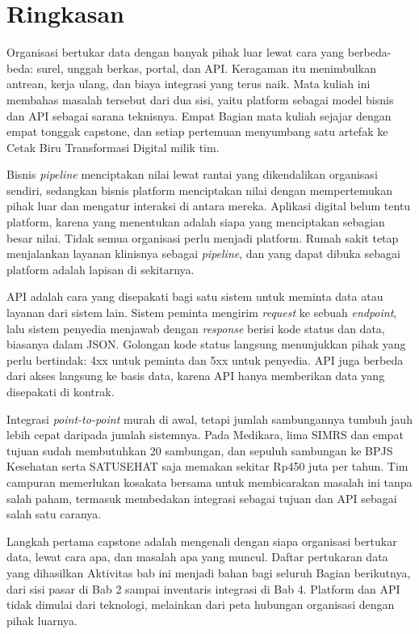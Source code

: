 \section{Ringkasan}

Organisasi bertukar data dengan banyak pihak luar lewat cara yang berbeda-beda:
surel, unggah berkas, portal, dan API. Keragaman itu menimbulkan antrean, kerja
ulang, dan biaya integrasi yang terus naik. Mata kuliah ini membahas masalah
tersebut dari dua sisi, yaitu platform sebagai model bisnis dan API sebagai
sarana teknisnya. Empat Bagian mata kuliah sejajar dengan empat tonggak capstone,
dan setiap pertemuan menyumbang satu artefak ke Cetak Biru Transformasi Digital
milik tim.

Bisnis \textit{pipeline} menciptakan nilai lewat rantai yang dikendalikan
organisasi sendiri, sedangkan bisnis platform menciptakan nilai dengan
mempertemukan pihak luar dan mengatur interaksi di antara mereka. Aplikasi digital
belum tentu platform, karena yang menentukan adalah siapa yang menciptakan
sebagian besar nilai. Tidak semua organisasi perlu menjadi platform. Rumah sakit
tetap menjalankan layanan klinisnya sebagai \textit{pipeline}, dan yang dapat
dibuka sebagai platform adalah lapisan di sekitarnya.

API adalah cara yang disepakati bagi satu sistem untuk meminta data atau layanan
dari sistem lain. Sistem peminta mengirim \textit{request} ke sebuah
\textit{endpoint}, lalu sistem penyedia menjawab dengan \textit{response} berisi
kode status dan data, biasanya dalam JSON. Golongan kode status langsung
menunjukkan pihak yang perlu bertindak: 4xx untuk peminta dan 5xx untuk penyedia.
API juga berbeda dari akses langsung ke basis data, karena API hanya memberikan
data yang disepakati di kontrak.

Integrasi \textit{point-to-point} murah di awal, tetapi jumlah sambungannya
tumbuh jauh lebih cepat daripada jumlah sistemnya. Pada Medikara, lima SIMRS dan
empat tujuan sudah membutuhkan 20 sambungan, dan sepuluh sambungan ke BPJS
Kesehatan serta SATUSEHAT saja memakan sekitar Rp450 juta per tahun. Tim campuran
memerlukan kosakata bersama untuk membicarakan masalah ini tanpa salah paham,
termasuk membedakan integrasi sebagai tujuan dan API sebagai salah satu caranya.

Langkah pertama capstone adalah mengenali dengan siapa organisasi bertukar data,
lewat cara apa, dan masalah apa yang muncul. Daftar pertukaran data yang
dihasilkan Aktivitas bab ini menjadi bahan bagi seluruh Bagian berikutnya, dari
sisi pasar di Bab 2 sampai inventaris integrasi di Bab 4. Platform dan API tidak
dimulai dari teknologi, melainkan dari peta hubungan organisasi dengan pihak
luarnya.

